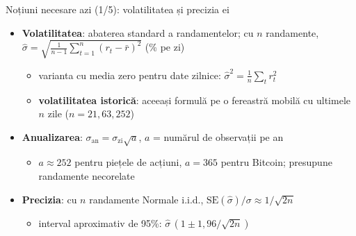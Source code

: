 \begin{frame}{Noțiuni necesare azi (1/5): volatilitatea și precizia ei}
\itemsize{\small}
\begin{itemize}
    \item \textbf{Volatilitatea}: abaterea standard a randamentelor; cu $n$ randamente, $\hat\sigma = \sqrt{\frac{1}{n-1}\sum_{t=1}^n (r_t - \bar r)^2}$ (\% pe zi)
    \begin{itemize}
        \item varianta cu media zero pentru date zilnice: $\hat\sigma^2 = \frac{1}{n}\sum_t r_t^2$
        \item \textbf{volatilitatea istorică}: aceeași formulă pe o fereastră mobilă cu ultimele $n$ zile ($n = 21, 63, 252$)
    \end{itemize}
    \item \textbf{Anualizarea}: $\sigma_{\text{an}} = \sigma_{\text{zi}}\sqrt{a}$, $a$ = numărul de observații pe an
    \begin{itemize}
        \item $a \approx 252$ pentru piețele de acțiuni, $a = 365$ pentru Bitcoin; presupune randamente necorelate
    \end{itemize}
    \item \textbf{Precizia}: cu $n$ randamente Normale i.i.d., $\mathrm{SE}(\hat\sigma)/\sigma \approx 1/\sqrt{2n}$
    \begin{itemize}
        \item interval aproximativ de 95\%: $\hat\sigma\,(1 \pm 1{,}96/\sqrt{2n})$
    \end{itemize}
\end{itemize}
\end{frame}

